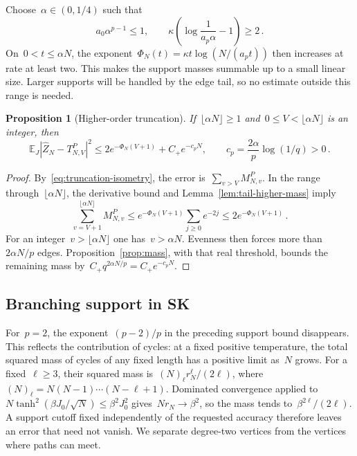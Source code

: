 \documentclass[10pt]{article}
\theoremstyle{plain}
\newtheorem{proposition}[theorem]{Proposition}
\theoremstyle{definition}
\theoremstyle{remark}
\begin{document}
Choose~$\alpha\in(0,1/4)$ such that
\begin{equation}\label{eq:tail-higher-alpha}
 a_0\alpha^{p-1}\le1,\qquad \kappa\left(\log\frac1{a_p\alpha}-1\right)\ge2\,.
\end{equation}
On~$0<t\le\alpha N$, the exponent~$\Phi_N(t)=\kappa t\log(N/(a_pt))$ then increases at rate at least two. This makes the support masses summable up to a small linear size. Larger supports will be handled by the edge tail, so no estimate outside this range is needed.
\begin{proposition}[Higher-order truncation]\label{prop:tail-higher}
If~$\lfloor\alpha N\rfloor\ge1$ and~$0\le V<\lfloor\alpha N\rfloor$ is an integer, then
\begin{equation}\label{eq:tail-higher-truncation}
 \mathbb E_J|\hat Z_N-T^P_{N,V}|^2
 \le2e^{-\Phi_N(V+1)}+C_+e^{-c_pN},\qquad
 c_p=\frac{2\alpha}{p}\log(1/q)>0\,.
\end{equation}
\end{proposition}
\begin{proof}
By~\eqref{eq:truncation-isometry}, the error is~$\sum_{v>V}M^P_{N,v}$. In the range through~$\lfloor\alpha N\rfloor$, the derivative bound and Lemma~\ref{lem:tail-higher-mass} imply
\begin{equation*}
 \sum_{v=V+1}^{\lfloor\alpha N\rfloor}M^P_{N,v}
 \le e^{-\Phi_N(V+1)}\sum_{j\ge0}e^{-2j}
 \le2e^{-\Phi_N(V+1)}\,.
\end{equation*}
For an integer~$v>\lfloor\alpha N\rfloor$ one has~$v>\alpha N$. Evenness then forces more than~$2\alpha N/p$ edges. Proposition~\ref{prop:mass}, with that real threshold, bounds the remaining mass by~$C_+q^{2\alpha N/p}=C_+e^{-c_pN}$.
\end{proof}

\subsection{Branching support in SK}\label{sec:sk-tails}
For~$p=2$, the exponent~$(p-2)/p$ in the preceding support bound disappears. This reflects the contribution of cycles: at a fixed positive temperature, the total squared mass of cycles of any fixed length has a positive limit as~$N$ grows. For a fixed~$\ell\ge3$, their squared mass is~$(N)_\ell r_N^\ell/(2\ell)$, where~$(N)_\ell=N(N-1)\cdots(N-\ell+1)$. Dominated convergence applied to~$N\tanh^2(\beta J_0/\sqrt N)\le\beta^2J_0^2$ gives~$Nr_N\to\beta^2$, so the mass tends to~$\beta^{2\ell}/(2\ell)$. A support cutoff fixed independently of the requested accuracy therefore leaves an error that need not vanish. We separate degree-two vertices from the vertices where paths can meet.
\end{document}
